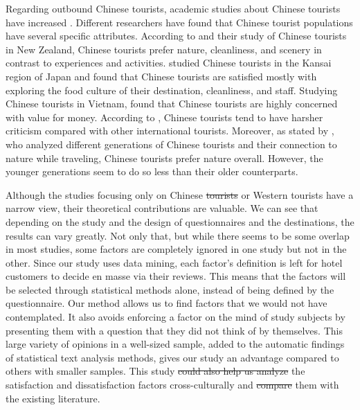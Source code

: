 \documentclass[smallextended,natbib]{svjour3}       %
\providecommand{\DIFadd}[1]{{\protect\color{blue}\uwave{#1}}} %
\providecommand{\DIFdel}[1]{{\protect\color{red}\sout{#1}}}                      %
\providecommand{\DIFaddbegin}{} %
\providecommand{\DIFaddend}{} %
\providecommand{\DIFdelbegin}{} %
\providecommand{\DIFdelend}{} %
\newcommand{\DIFscaledelfig}{0.5}
\newlength{\DIFdelgraphicswidth} %
\newlength{\DIFdelgraphicsheight} %
\newcommand{\DIFaddincludegraphics}[2][]{{\color{blue}\fbox{\DIFOincludegraphics[#1]{#2}}}} %
\newcommand{\DIFdelincludegraphics}[2][]{%
\sbox{\DIFdelgraphicsbox}{\DIFOincludegraphics[#1]{#2}}%
\settoboxwidth{\DIFdelgraphicswidth}{\DIFdelgraphicsbox} %
\settoboxtotalheight{\DIFdelgraphicsheight}{\DIFdelgraphicsbox} %
\scalebox{\DIFscaledelfig}{%
\parbox[b]{\DIFdelgraphicswidth}{\usebox{\DIFdelgraphicsbox}\\[-\baselineskip] \rule{\DIFdelgraphicswidth}{0em}}\llap{\resizebox{\DIFdelgraphicswidth}{\DIFdelgraphicsheight}{%
\setlength{\unitlength}{\DIFdelgraphicswidth}%
\begin{picture}(1,1)%
\thicklines\linethickness{2pt} %
{\color[rgb]{1,0,0}\put(0,0){\framebox(1,1){}}}%
{\color[rgb]{1,0,0}\put(0,0){\line( 1,1){1}}}%
{\color[rgb]{1,0,0}\put(0,1){\line(1,-1){1}}}%
\end{picture}%
}\hspace*{3pt}}} %
} %
\DeclareRobustCommand{\DIFaddbegin}{\DIFOaddbegin \let\includegraphics\DIFaddincludegraphics} %
\DeclareRobustCommand{\DIFaddend}{\DIFOaddend \let\includegraphics\DIFOincludegraphics} %
\DeclareRobustCommand{\DIFdelbegin}{\DIFOdelbegin \let\includegraphics\DIFdelincludegraphics} %
\DeclareRobustCommand{\DIFdelend}{\DIFOaddend \let\includegraphics\DIFOincludegraphics} %
\begin{document}
    Regarding outbound Chinese tourists, academic studies about Chinese tourists have increased \cite[][]{sun2017}. Different researchers have found that Chinese tourist populations have several specific attributes. According to \cite{ryan2001} and their study of Chinese tourists in New Zealand, Chinese tourists prefer nature, cleanliness, and scenery in contrast to experiences and activities. \cite{dongyang2015} studied Chinese tourists in the Kansai region of Japan and found that Chinese tourists are satisfied mostly with exploring the food culture of their destination, cleanliness, and staff. Studying Chinese tourists in Vietnam, \cite{truong2009} found that Chinese tourists are highly concerned with value for money. According to \cite{liu2019}, Chinese tourists tend to have harsher criticism compared with other international tourists. Moreover, as stated by \cite{gao2017chinese}, who analyzed different generations of Chinese tourists and their connection to nature while traveling, Chinese tourists prefer nature overall. However, the younger generations seem to do so less than their older counterparts. 

    Although the studies focusing only on Chinese \DIFdelbegin \DIFdel{tourists }\DIFdelend or Western tourists have a narrow view, their theoretical contributions are valuable. We can see that depending on the study and the design of questionnaires and the destinations, the results can vary greatly. Not only that, but while there seems to be some overlap in most studies, some factors are completely ignored in one study but not in the other. Since our study uses data mining, each factor's definition is left for hotel customers to decide en masse via their reviews. This means that the factors will be selected through statistical methods alone, instead of being defined by the questionnaire. Our method allows us to find factors that we would not have contemplated. It also avoids enforcing a factor on the mind of study subjects by presenting them with a question that they did not think of by themselves. This large variety of opinions in a well-sized sample, added to the automatic findings of statistical text analysis methods, gives our study an advantage compared to others with smaller samples. This study \DIFdelbegin \DIFdel{could also help us analyze }\DIFdelend \DIFaddbegin \DIFadd{analyzes }\DIFaddend the satisfaction and dissatisfaction factors cross-culturally and \DIFdelbegin \DIFdel{compare }\DIFdelend \DIFaddbegin \DIFadd{compares }\DIFaddend them with the existing literature.
\end{document}
